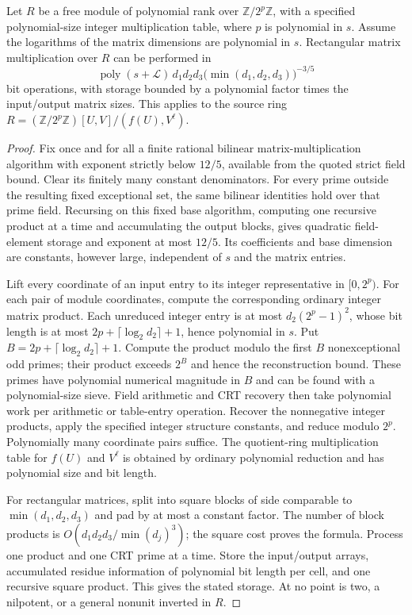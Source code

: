 \begin{lemma}
\label{lem:coordinate-bridge}
Let $R$ be a free module of polynomial rank over $\mathbb Z/2^p\mathbb Z$, with a specified polynomial-size integer multiplication table, where $p$ is polynomial in $s$. Assume the logarithms of the matrix dimensions are polynomial in $s$. Rectangular matrix multiplication over $R$ can be performed in
\[
 \operatorname{poly}(s+\mathcal L)\,
 d_1d_2d_3\bigl(\min(d_1,d_2,d_3)\bigr)^{-3/5}
\]
bit operations, with storage bounded by a polynomial factor times the input/output matrix sizes. This applies to the source ring
$R=(\mathbb Z/2^p\mathbb Z)[U,V]/(f(U),V^\ell)$.
\end{lemma}
\begin{proof}
Fix once and for all a finite rational bilinear matrix-multiplication algorithm with exponent strictly below $12/5$, available from the quoted strict field bound. Clear its finitely many constant denominators. For every prime outside the resulting fixed exceptional set, the same bilinear identities hold over that prime field. Recursing on this fixed base algorithm, computing one recursive product at a time and accumulating the output blocks, gives quadratic field-element storage and exponent at most $12/5$. Its coefficients and base dimension are constants, however large, independent of $s$ and the matrix entries.

Lift every coordinate of an input entry to its integer representative in $[0,2^p)$. For each pair of module coordinates, compute the corresponding ordinary integer matrix product. Each unreduced integer entry is at most $d_2(2^p-1)^2$, whose bit length is at most $2p+\lceil\log_2d_2\rceil+1$, hence polynomial in $s$. Put $B=2p+\lceil\log_2d_2\rceil+1$. Compute the product modulo the first $B$ nonexceptional odd primes; their product exceeds $2^B$ and hence the reconstruction bound. These primes have polynomial numerical magnitude in $B$ and can be found with a polynomial-size sieve. Field arithmetic and CRT recovery then take polynomial work per arithmetic or table-entry operation. Recover the nonnegative integer products, apply the specified integer structure constants, and reduce modulo $2^p$. Polynomially many coordinate pairs suffice. The quotient-ring multiplication table for $f(U)$ and $V^\ell$ is obtained by ordinary polynomial reduction and has polynomial size and bit length.

For rectangular matrices, split into square blocks of side comparable to $\min(d_1,d_2,d_3)$ and pad by at most a constant factor. The number of block products is $O(d_1d_2d_3/\min(d_j)^3)$; the square cost proves the formula. Process one product and one CRT prime at a time. Store the input/output arrays, accumulated residue information of polynomial bit length per cell, and one recursive square product. This gives the stated storage. At no point is two, a nilpotent, or a general nonunit inverted in $R$.
\end{proof}

